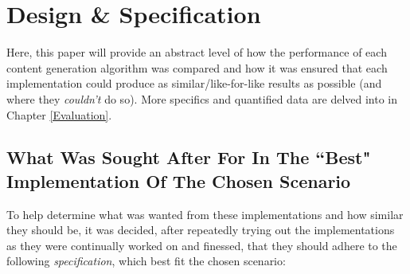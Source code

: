\chapter{Design \& Specification} \label{Design}
  
% 

Here, this paper will provide an abstract level of how the performance of each content generation algorithm was compared and how it was ensured that each implementation could produce as similar/like-for-like results as possible (and where they \textit{couldn't} do so). More specifics and quantified data are delved into in Chapter \ref{Evaluation}.

\section{What Was Sought After For In The ``Best" Implementation Of The Chosen Scenario}

To help determine what was wanted from these implementations and how similar they should be, it was decided, after repeatedly trying out the implementations as they were continually worked on and finessed, that they should adhere to the following \textit{specification}, which best fit the chosen scenario:

